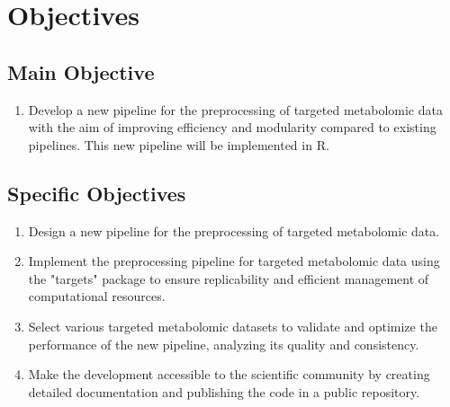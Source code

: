 \documentclass[ENG, BIB]{TFUOC}%
\begin{document}
\chapter{Objectives}

\section{Main Objective}
\begin{enumerate}
\item Develop a new pipeline for the preprocessing of targeted metabolomic data with the aim of improving efficiency and modularity compared to existing pipelines. This new pipeline will be implemented in R.
\end{enumerate}

\section{Specific Objectives}

\begin{enumerate}
\item Design a new pipeline for the preprocessing of targeted metabolomic data.
\item Implement the preprocessing pipeline for targeted metabolomic data using the "targets" package to ensure replicability and efficient management of computational resources.
\item Select various targeted metabolomic datasets to validate and optimize the performance of the new pipeline, analyzing its quality and consistency.
\item Make the development accessible to the scientific community by creating detailed documentation and publishing the code in a public repository.
\end{enumerate}



\end{document}
